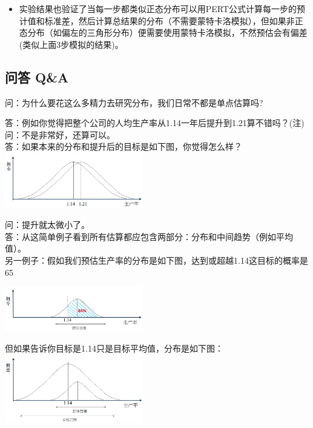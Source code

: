\begin{itemize}
\tightlist
\item
  实验结果也验证了当每一步都类似正态分布可以用PERT公式计算每一步的预计值和标准差，然后计算总结果的分布（不需要蒙特卡洛模拟），但如果非正态分布（如偏左的三角形分布）便需要使用蒙特卡洛模拟，不然预估会有偏差(类似上面3步模拟的结果)。
\end{itemize}

\hypertarget{ux4eceux5355ux70b9ux5230ux4e09ux70b9ux4f30ux7b97}{%
\subsection{问答 Q\&A}\label{ux4eceux5355ux70b9ux5230ux4e09ux70b9ux4f30ux7b97}}

问：为什么要花这么多精力去研究分布，我们日常不都是单点估算吗?

答：例如你觉得把整个公司的人均生产率从1.14一年后提升到1.21算不错吗？(注)
问：不是非常好，还算可以。\\
答：如果本来的分布和提升后的目标是如下图，你觉得怎么样？\\

\includegraphics[width=6cm]{4_三点估算问与答1.jpg}

问：提升就太微小了。\\
答：从这简单例子看到所有估算都应包含两部分：分布和中间趋势（例如平均值）。\\
另一例子：假如我们预估生产率的分布是如下图，达到或超越1.14这目标的概率是65%

\includegraphics[width=6cm]{4_fig2a_2024-01-15_211344.jpg}

但如果告诉你目标是1.14只是目标平均值，分布是如下图：\\

\includegraphics[width=6cm]{4_三点估算问与答2.jpg}

